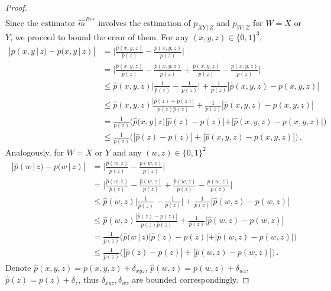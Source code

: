\documentclass{article}
\theoremstyle{definition}
\theoremstyle{definition}
\theoremstyle{definition}
\theoremstyle{definition}
\theoremstyle{definition}
\theoremstyle{definition}
\theoremstyle{remark}
\theoremstyle{remark}
\newcommand{\given}{\,|\,}
\newcommand{\dpdm}{m}
\begin{document}
\begin{proof}
\begin{align*}
\end{align*}
Since the estimator $\widehat{\dpdm}^{Ber}$ involves the estimation of $p_{XY\given Z}$ and $p_{W\given Z}$ for $W=X$ or $Y$, we proceed to bound the error of them. For any $(x,y,z)\in\{0,1\}^3$,
\begin{align*}
    |\widehat{p}(x,y\given z) - p(x,y\given z)| & = \Big| \frac{\widehat{p}(x,y,z)}{\widehat{p}(z)} - \frac{p(x,y,z)}{p(z)} \Big| \\
    & = \Big| \frac{\widehat{p}(x,y,z)}{\widehat{p}(z)}  - \frac{\widehat{p}(x,y,z)}{p(z)} + \frac{\widehat{p}(x,y,z)}{p(z)} - \frac{p(x,y,z)}{p(z)} \Big|  \\
    & \le \widehat{p}(x,y,z) \Big| \frac{1}{\widehat{p}(z)} - \frac{1}{p(z)} \Big| + \frac{1}{p(z)} |\widehat{p}(x,y,z) - p(x,y,z)| \\
    & \le \widehat{p}(x,y,z) \frac{|\widehat{p}(z) - p(z)|}{p(z)\widehat{p}(z)} + \frac{1}{p(z)} |\widehat{p}(x,y,z) - p(x,y,z)|\\
    & = \frac{1}{p(z)} \Big(\widehat{p}(x,y\given z) |\widehat{p}(z) - p(z)| +  |\widehat{p}(x,y,z) - p(x,y,z)|\Big)\\
    & \le \frac{1}{p(z)} \Big( |\widehat{p}(z) - p(z)| +  |\widehat{p}(x,y,z) - p(x,y,z)|\Big) \,.
\end{align*}
Analogously, for $W=X$ or $Y$ and any $(w,z)\in\{0,1\}^2$
\begin{align*}
    |\widehat{p}(w\given z) - p(w\given z)| & = \Big| \frac{\widehat{p}(w,z)}{\widehat{p}(z)} - \frac{p(w,z)}{p(z)} \Big| \\
    & = \Big| \frac{\widehat{p}(w,z)}{\widehat{p}(z)}  - \frac{\widehat{p}(w,z)}{p(z)} + \frac{\widehat{p}(w,z)}{p(z)} - \frac{p(w,z)}{p(z)} \Big|  \\
    & \le \widehat{p}(w,z) \Big| \frac{1}{\widehat{p}(z)} - \frac{1}{p(z)} \Big| + \frac{1}{p(z)} |\widehat{p}(w,z) - p(w,z)| \\
    & \le \widehat{p}(w,z) \frac{|\widehat{p}(z) - p(z)|}{p(z)\widehat{p}(z)} + \frac{1}{p(z)} |\widehat{p}(w,z) - p(w,z)|\\
    & = \frac{1}{p(z)} \Big(\widehat{p}(w\given z) |\widehat{p}(z) - p(z)| +  |\widehat{p}(w,z) - p(w,z)|\Big)\\
    & \le \frac{1}{p(z)} \Big( |\widehat{p}(z) - p(z)| +  |\widehat{p}(w,z) - p(w,z)|\Big) \,.
\end{align*}
Denote $\widehat{p}(x,y,z)=p(x,y,z)+\delta_{xyz}$, $\widehat{p}(w,z) = p(w,z) + \delta_{wz}$, $\widehat{p}(z)=p(z)+\delta_z$, thus $\delta_{xyz},\delta_{wz}$ are bounded correspondingly.

\end{proof}
\end{document}
